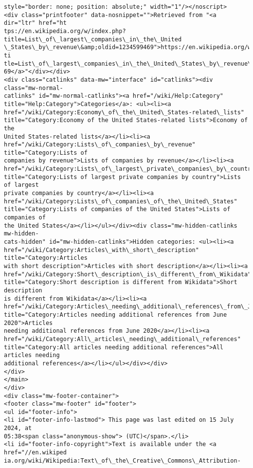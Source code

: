 \documentclass[11pt]{article}
\begin{document}
\begin{Verbatim}[commandchars=\\\{\}]
style="border: none; position: absolute;" width="1"/></noscript>
<div class="printfooter" data-nosnippet="">Retrieved from "<a dir="ltr" href="ht
tps://en.wikipedia.org/w/index.php?title=List\_of\_largest\_companies\_in\_the\_United
\_States\_by\_revenue\&amp;oldid=1234599469">https://en.wikipedia.org/w/index.php?ti
tle=List\_of\_largest\_companies\_in\_the\_United\_States\_by\_revenue\&amp;oldid=12345994
69</a>"</div></div>
<div class="catlinks" data-mw="interface" id="catlinks"><div class="mw-normal-
catlinks" id="mw-normal-catlinks"><a href="/wiki/Help:Category"
title="Help:Category">Categories</a>: <ul><li><a
href="/wiki/Category:Economy\_of\_the\_United\_States-related\_lists"
title="Category:Economy of the United States-related lists">Economy of the
United States-related lists</a></li><li><a
href="/wiki/Category:Lists\_of\_companies\_by\_revenue" title="Category:Lists of
companies by revenue">Lists of companies by revenue</a></li><li><a
href="/wiki/Category:Lists\_of\_largest\_private\_companies\_by\_country"
title="Category:Lists of largest private companies by country">Lists of largest
private companies by country</a></li><li><a
href="/wiki/Category:Lists\_of\_companies\_of\_the\_United\_States"
title="Category:Lists of companies of the United States">Lists of companies of
the United States</a></li></ul></div><div class="mw-hidden-catlinks mw-hidden-
cats-hidden" id="mw-hidden-catlinks">Hidden categories: <ul><li><a
href="/wiki/Category:Articles\_with\_short\_description" title="Category:Articles
with short description">Articles with short description</a></li><li><a
href="/wiki/Category:Short\_description\_is\_different\_from\_Wikidata"
title="Category:Short description is different from Wikidata">Short description
is different from Wikidata</a></li><li><a
href="/wiki/Category:Articles\_needing\_additional\_references\_from\_June\_2020"
title="Category:Articles needing additional references from June 2020">Articles
needing additional references from June 2020</a></li><li><a
href="/wiki/Category:All\_articles\_needing\_additional\_references"
title="Category:All articles needing additional references">All articles needing
additional references</a></li></ul></div></div>
</div>
</main>
</div>
<div class="mw-footer-container">
<footer class="mw-footer" id="footer">
<ul id="footer-info">
<li id="footer-info-lastmod"> This page was last edited on 15 July 2024, at
05:38<span class="anonymous-show"> (UTC)</span>.</li>
<li id="footer-info-copyright">Text is available under the <a href="//en.wikiped
ia.org/wiki/Wikipedia:Text\_of\_the\_Creative\_Commons\_Attribution-

\end{Verbatim}
\end{document}

